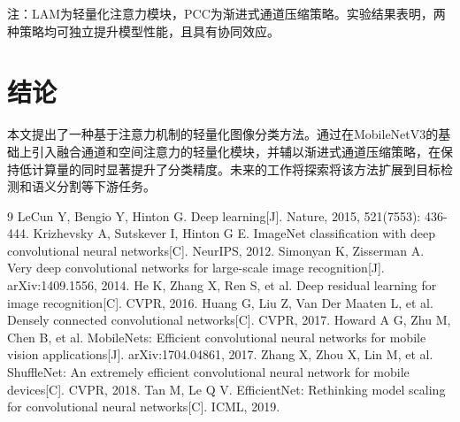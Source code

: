 \documentclass{harryopo-paper}
\begin{document}
注：LAM为轻量化注意力模块，PCC为渐进式通道压缩策略。实验结果表明，两种策略均可独立提升模型性能，且具有协同效应。

\section{结论}

本文提出了一种基于注意力机制的轻量化图像分类方法。通过在MobileNetV3的基础上引入融合通道和空间注意力的轻量化模块，并辅以渐进式通道压缩策略，在保持低计算量的同时显著提升了分类精度。未来的工作将探索将该方法扩展到目标检测和语义分割等下游任务。

\printfunding

\begin{thebibliography}{9}
 LeCun Y, Bengio Y, Hinton G. Deep learning[J]. Nature, 2015, 521(7553): 436-444.
 Krizhevsky A, Sutskever I, Hinton G E. ImageNet classification with deep convolutional neural networks[C]. NeurIPS, 2012.
 Simonyan K, Zisserman A. Very deep convolutional networks for large-scale image recognition[J]. arXiv:1409.1556, 2014.
 He K, Zhang X, Ren S, et al. Deep residual learning for image recognition[C]. CVPR, 2016.
 Huang G, Liu Z, Van Der Maaten L, et al. Densely connected convolutional networks[C]. CVPR, 2017.
 Howard A G, Zhu M, Chen B, et al. MobileNets: Efficient convolutional neural networks for mobile vision applications[J]. arXiv:1704.04861, 2017.
 Zhang X, Zhou X, Lin M, et al. ShuffleNet: An extremely efficient convolutional neural network for mobile devices[C]. CVPR, 2018.
 Tan M, Le Q V. EfficientNet: Rethinking model scaling for convolutional neural networks[C]. ICML, 2019.
\end{thebibliography}

\printauthorbio
\end{document}
